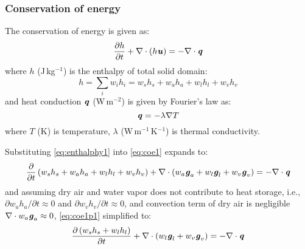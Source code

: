 \subsubsection*{Conservation of energy}
The conservation of energy is given as:
\begin{equation}
\frac{\partial h}{\partial t} + \nabla \cdot \left(h \textbf{\textit{u}}\right) = - \nabla \cdot \textbf{\textit{q}}
\label{eq:coe1}
\end{equation}
where $h$ (J\,kg$^{-1}$) is the enthalpy of total solid domain:
\begin{equation}
h = \sum_i w_i h_i = w_s h_s + w_a h_a + w_l h_l + w_v h_v
\label{eq:enthalphy1}
\end{equation}
and heat conduction $\textbf{\textit{q}}$ (W\,m$^{-2}$) is given by Fourier's law as:
\begin{equation}
\textbf{\textit{q}} = -\lambda \nabla T
\label{eq:fourierlaw}
\end{equation}
where $T$ (K) is temperature, $\lambda$ (W\,m$^{-1}$\,K$^{-1}$) is thermal conductivity.

Substituting \cref{eq:enthalphy1} into \cref{eq:coe1} expands to:
\begin{equation}
\frac{\partial}{\partial t}\left(w_s h_s + w_a h_a + w_l h_l + w_v h_v \right) + \nabla \cdot \left(w_a \textbf{\textit{g}}_a + w_l \textbf{\textit{g}}_l + w_v \textbf{\textit{g}}_v\right) = - \nabla \cdot \textbf{\textit{q}}
\label{eq:coe1p1}
\end{equation}
and assuming dry air and water vapor does not contribute to heat storage, i.e., $\partial w_a h_a / \partial t \approx 0$ and $\partial w_v h_v / \partial t \approx 0$, and convection term of dry air is negligible $\nabla \cdot w_a \textbf{\textit{g}}_a \approx 0$, \cref{eq:coe1p1} simplified to:
\begin{equation}
\frac{\partial \left(w_s h_s + w_l h_l \right)}{\partial t} + \nabla \cdot \left(w_l \textbf{\textit{g}}_l + w_v \textbf{\textit{g}}_v\right) = - \nabla \cdot \textbf{\textit{q}}
\label{eq:coe1p2}
\end{equation}


